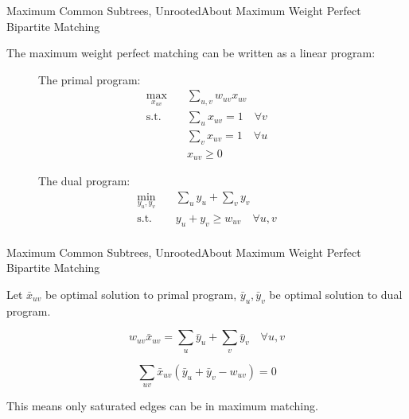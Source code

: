 \documentclass[handout]{beamer}
\begin{document}
\begin{frame}{Maximum Common Subtrees, Unrooted}{About Maximum Weight Perfect Bipartite Matching}

The maximum weight perfect matching can be written as a linear program:

\begin{figure}
\centering
\begin{minipage}{0.45\linewidth}
	The primal program:
\begin{align*}
\max_{x_{uv}} \quad & \sum_{u,v} w_{uv} x_{uv} \\
\text{s.t.} \quad & \sum_{u} x_{uv} = 1 \quad \forall v \\
& \sum_{v} x_{uv} = 1 \quad \forall u \\
& x_{uv} \geq 0
\end{align*}
\end{minipage}
\pause
\begin{minipage}{0.45\linewidth}
	The dual program:
\begin{align*}
\min_{y_u, y_v} \quad & \sum_u y_u + \sum_v y_v \\
\text{s.t.} \quad & y_u + y_v \geq w_{uv} \quad \forall u, v \\
\end{align*}
\end{minipage}
\end{figure}

\end{frame}

\begin{frame}{Maximum Common Subtrees, Unrooted}{About Maximum Weight Perfect Bipartite Matching}

Let $\bar{x}_{uv}$ be optimal solution to primal program, $\bar{y}_u, \bar{y}_v$ be optimal solution to dual program.

\begin{theorem}
$$w_{uv} \bar{x}_{uv} = \sum_u \bar{y}_u + \sum_v \bar{y}_v \quad \forall u, v$$
\end{theorem}

\pause

\begin{theorem}
$$
\sum_{uv} \bar{x}_{uv} (\bar{y}_u + \bar{y}_v - w_{uv}) = 0
$$	

This means only saturated edges can be in maximum matching.
\end{theorem}

\end{frame}
\end{document}
